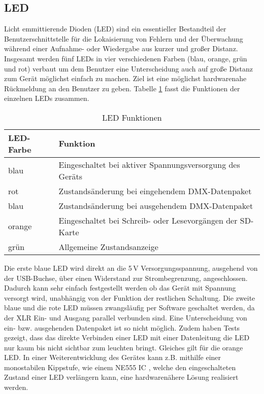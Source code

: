 
\subsection{LED}

Licht emmittierende Dioden (LED) sind ein essentieller Bestandteil der Benutzerschnittstelle für die Lokaisierung von Fehlern und der Überwachung während einer Aufnahme- oder Wiedergabe aus kurzer und großer Distanz. Insgesamt werden fünf LEDs in vier verschiedenen Farben (blau, orange, grün und rot) verbaut um dem Benutzer eine Unterscheidung auch auf große Distanz zum Gerät möglichst einfach zu machen. Ziel ist eine möglichst hardwarenahe Rückmeldung an den Benutzer zu geben. Tabelle \ref{table:LED} fasst die Funktionen der einzelnen LEDs zusammen. 
\begin{table}[h]
	\begin{center}
		\caption{LED Funktionen}
		\begin{tabular}{l | l}
				\textbf{LED-Farbe} & \textbf{Funktion}\\
				\hline
				blau & Eingeschaltet bei aktiver Spannungsversorgung des Geräts\\
				rot & Zustandsänderung bei eingehendem DMX-Datenpaket\\
				blau & Zustandsänderung bei ausgehendem DMX-Datenpaket\\
				orange & Eingeschaltet bei Schreib- oder Lesevorgängen der SD-Karte\\
				grün & Allgemeine Zustandsanzeige
		\end{tabular}
		\label{table:LED}
	\end{center}
\end{table}
Die erste blaue LED wird direkt an die 5\,V Versorgungsspannung, ausgehend von der USB-Buchse, über einen Widerstand zur Strombegrenzung, angeschlossen. Dadurch kann sehr einfach festgestellt werden ob das Gerät mit Spannung versorgt wird, unabhängig von der Funktion der restlichen Schaltung. Die zweite blaue und die rote LED müssen zwangsläufig per Software geschaltet werden, da der XLR Ein- und Ausgang parallel verbunden sind. Eine Unterscheidung von ein- bzw. ausgehenden Datenpaket ist so nicht möglich. Zudem haben Tests gezeigt, dass das direkte Verbinden einer LED mit einer Datenleitung die LED nur kaum bis nicht sichtbar zum leuchten bringt. Gleiches gilt für die orange LED. In einer Weiterentwicklung des Gerätes kann z.B. mithilfe einer monostabilen Kippstufe, wie einem NE555 IC \cite{NE555}, welche den eingeschalteten Zustand einer LED verlängern kann, eine hardwarenähere Lösung realisiert werden.
